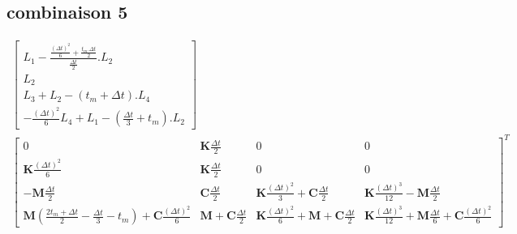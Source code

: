 \documentclass[12pt,a4paper]{report}
\begin{document}
\subsection{combinaison 5}
\begin{equation}
\!\!\!\!\!\!\!\!\!\!\!\!\!\!\!\!\!\!\!\!\!\!\!\!
\begin{array}{c}
	\begin{bmatrix}	
		  L_1 - \frac{ \frac{(\Delta t)^2}{6} + \frac{t_m.\Delta t}{2} }
				   { \frac{\Delta t}{2} }.L_2
		\\ L_2
		\\ L_3 + L_2 - (t_m+\Delta t).L_4
		\\  -\frac{(\Delta t)^2}{6} L_4 
			+ L_1 
			- \left( \frac{\Delta t}{3} + t_m \right).L_2
	\end{bmatrix}
	\\
		\begin{bmatrix}	   
			   0
			&
		   		\mathbf{K} \frac{\Delta t}{2}
		   	&   
		   		0
			&
		   		0
		\\   
			   \mathbf{K} \frac{(\Delta t)^2}{6}
			&
		   		\mathbf{K} \frac{\Delta t}{2} 
		   	&
		   		0
			&
		   		0
		\\   
			   -\mathbf{M}
			   		\frac{\Delta t}{2}   
		   	& 
		   		\mathbf{C} \frac{\Delta t}{2}
		   	&
			   	\mathbf{K}
			   		\frac{(\Delta t)^2}{3} 
		   		+\mathbf{C} \frac{\Delta t}{2}
		   	&
		   		\mathbf{K} \frac{(\Delta t)^3}{12}
		   		-\mathbf{M}
			   		\frac{\Delta t}{2} 
		\\   
			   \mathbf{M}
			   		\left(	\frac{2t_m + \Delta t}{2} 
			   		 		-\frac{\Delta t}{3} 
			   		 		- t_m \right)
			   +\mathbf{C} \frac{(\Delta t)^2}{6} 
		   	&
			   \mathbf{M} 
			   +\mathbf{C} \frac{\Delta t}{2}
		   	&
		   		\mathbf{K} \frac{(\Delta t)^2}{6} 
		   		+\mathbf{M} 
			   	+\mathbf{C} \frac{\Delta t}{2}
		   	&
		   		\mathbf{K} \frac{(\Delta t)^3}{12}
		   		+\mathbf{M} \frac{\Delta t}{6} 
			   +\mathbf{C} \frac{(\Delta t)^2}{6} 
	\end{bmatrix}^T
\end{array}
\end{equation}
\end{document}
